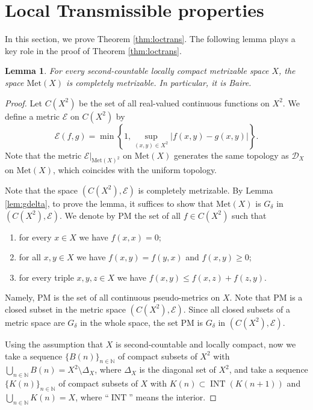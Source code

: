 \documentclass[a4paper, 12pt]{amsart}
\theoremstyle{plain}
\newtheorem{lem}[thm]{Lemma}
\theoremstyle{definition}
\theoremstyle{remark}
\newcommand{\nn}{\mathbb{N}}
\DeclareMathOperator{\nai}{INT}
\newcommand{\met}[1]{\mathrm{Met}(#1)}
\newcommand{\metdis}{\mathcal{D}}
\newcommand{\yopset}{\mathrm{PM}}
\newcommand{\yodset}[1]{B(#1)}
\newcommand{\yokset}[1]{K(#1)}
\begin{document}
\section{Local Transmissible  properties}\label{sec:loctrans}
In this section, 
we prove Theorem 
\ref{thm:loctrans}. 
The following lemma plays  a key role in the proof of Theorem \ref{thm:loctrans}. 
\begin{lem}\label{lem:Baire}
For 
every  second-countable  locally compact metrizable space 
$X$, 
the space 
$\met{X}$
 is  completely metrizable. 
 In particular,  it is Baire. 
\end{lem}
\begin{proof}
Let 
$C(X^{2})$ 
be the set of all real-valued continuous functions on $X^{2}$.
We define a metric 
$\mathcal{E}$ 
on
 $C(X^{2})$ 
by 
\begin{equation*}\label{eq:E}
\mathcal{E}(f, g)=\min\left\{1,\sup_{(x, y)\in X^{2}}|f(x, y)-g(x, y)|\right\}. 
\end{equation*}
Note that
the metric 
$\mathcal{E}|_{\met{X}^{2}}$ 
on 
$\met{X}$  
generates the same topology as  
$\metdis_{X}$ 
on 
$\met{X}$, 
which coincides  with the uniform topology.  




Note that  the space 
$(C(X^{2}), \mathcal{E})$ 
is completely metrizable. 
By Lemma 
\ref{lem:gdelta}, 
to prove the lemma, 
it suffices to show that 
$\met{X}$ 
is 
$G_{\delta}$ 
in  
$(C(X^{2}), \mathcal{E})$.
We denote by
 $\yopset$ 
 the set of all 
$f\in C(X^{2})$ 
such that 
\begin{enumerate}
	
	\item for every 
	$x\in X$ 
	we have 
	$f(x, x)=0$;
	
	\item 
	for all
	 $x, y\in X$ 
	 we have 
	 $f(x, y)=f(y, x)$
	 and 
	 $f(x, y)\ge 0$;
	 
	\item for every triple 
	$x, y, z\in X$
	 we have  $
	 f(x, y)\le f(x, z)+f(z, y)$. 
\end{enumerate}
Namely, 
$\yopset$ 
is the set of all 
continuous pseudo-metrics on 
$X$. 
Note that 
$\yopset$ 
is 
a closed subset in  the metric space 
$(C(X^{2}), \mathcal{E})$. 
Since all closed subsets 
of a metric space are 
$G_{\delta}$ 
in the whole space, 
the set 
$\yopset$ 
is 
$G_{\delta}$ 
in 
$(C(X^{2}), \mathcal{E})$. 


Using the assumption that 
$X$ 
is second-countable and  locally compact, 
now  we take a sequence 
$\{\yodset{n}\}_{n\in \nn}$ 
of compact subsets of 
$X^{2}$ 
with 
$\bigcup_{n\in \nn}\yodset{n}=X^{2}\setminus \Delta_{X}$, 
where 
$\Delta_{X}$ 
is the diagonal set of 
$X^{2}$, 
and take a sequence 
$\{\yokset{n}\}_{n\in \nn}$ 
of compact subsets of 
$X$ 
with 
$\yokset{n}\subset \nai(\yokset{n+1})$ 
and 
$\bigcup_{n\in \nn} \yokset{n}=X$, 
where 
``$\nai$''
means the interior. 



\end{proof}
\end{document}
